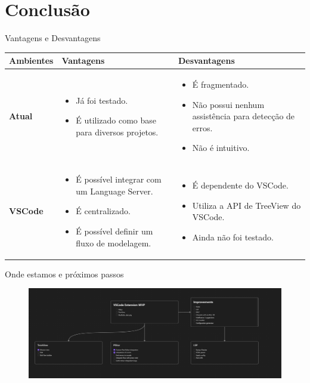 \documentclass{beamer}
\begin{document}
\section{Conclusão}
\begin{frame}{Vantagens e Desvantagens}
  \begin{table}[h!]
      \centering
      \begin{tabular}{|p{2cm}|p{4cm}|p{4.5cm}|}
        \hline
        \textbf{Ambientes} & \textbf{Vantagens} & \textbf{Desvantagens} \\
        \hline
        \textbf{Atual} & 
          \begin{itemize}
            \item Já foi testado.
            \item É utilizado como base para diversos projetos.
          \end{itemize}&
          \begin{itemize}
            \item É fragmentado.
            \item Não possui nenhum assistência para detecção de erros.
            \item Não é intuitivo.
          \end{itemize}\\
        \hline
        \textbf{VSCode} & 
          \begin{itemize}
            \item É possível integrar com um Language Server.
            \item É centralizado.
            \item É possível definir um fluxo de modelagem.
          \end{itemize}&
          \begin{itemize}
            \item É dependente do VSCode.
            \item Utiliza a API de TreeView do VSCode.
            \item Ainda não foi testado.
          \end{itemize}\\
        \hline
      \end{tabular}
    \end{table}
\end{frame}
\begin{frame}{Onde estamos e próximos passos}
  \begin{figure}[!h]
    \centering
    \includegraphics[width=1\textwidth]{VSCode extension.png} 
    \caption{}
  \end{figure}
\end{frame}
\end{document}
